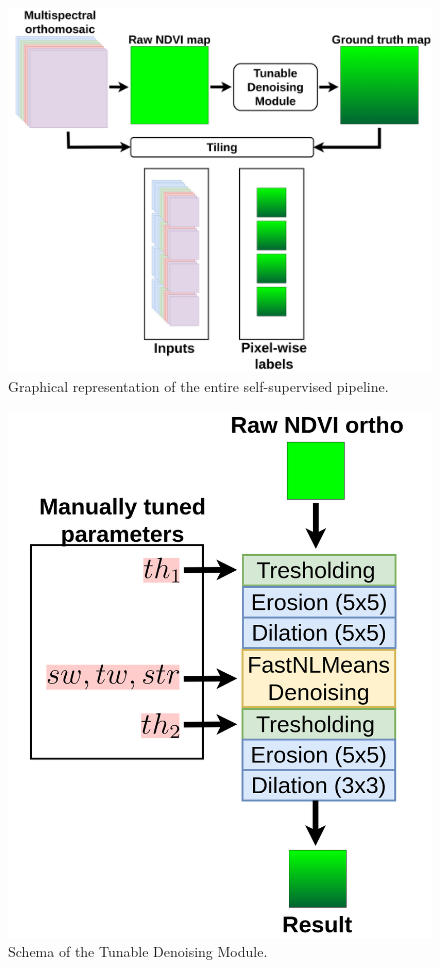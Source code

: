 \documentclass[comsoc,final]{IEEEtran}
\begin{document}
\begin{figure}
    \centering
    \includegraphics[width=\columnwidth]{pipeline1}
    \caption{Graphical representation of the entire self-supervised pipeline.}
    \label{fig:entirepipeline}
\end{figure}

\begin{figure}
    \centering
    \includegraphics[width=0.8\columnwidth]{tunable_module}
    \caption{Schema of the Tunable Denoising Module.}
    \label{fig:tunable_module}
\end{figure}
\end{document}

